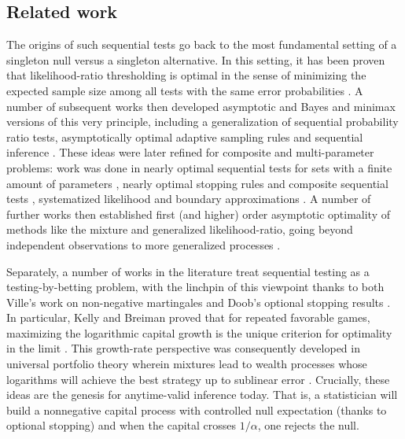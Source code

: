 \documentclass{article}
\theoremstyle{definition}
\begin{document}
\subsection*{Related work}
The origins of such sequential tests go back to the most fundamental setting of a singleton null versus a singleton alternative. In this setting, it has been proven that likelihood-ratio thresholding is optimal in the sense of minimizing the expected sample size among all tests with the same error probabilities \citep{Wald1945, WaldWolfowitz1948}. A number of subsequent works then developed asymptotic and Bayes and minimax versions of this very principle, including a generalization of sequential probability ratio tests, asymptotically optimal adaptive sampling rules and sequential inference \citep{KeiferWeiss, chernoff1959, KiefferSacks}. These ideas were later refined for composite and multi-parameter problems: work was done in nearly optimal sequential tests for sets with a finite amount of parameters \citep{Lorden1977}, nearly optimal stopping rules and composite sequential tests \citep{lai1973, Lai1988}, systematized likelihood and boundary approximations \citep{Siegmund1986}. A number of further works then established first (and higher) order asymptotic optimality of methods like the mixture and generalized likelihood-ratio, going beyond independent observations to more generalized processes \citep{Dragalin1999, Fellouris2013}.

Separately, a number of works in the literature treat sequential testing as a testing-by-betting problem, with the linchpin of this viewpoint thanks to both Ville's work on non-negative martingales and Doob's optional stopping results \citep{Ville1939, doob1953stochastic}. In particular, Kelly and Breiman proved that for repeated favorable games, maximizing the logarithmic capital growth is the unique criterion for optimality in the limit \citep{kellyinterpretation, breiman1961optimal}. This growth-rate perspective was consequently developed in universal portfolio theory wherein mixtures lead to wealth processes whose logarithms will achieve the best strategy up to sublinear error \citep{cover1987log, cover1996}. Crucially, these ideas are the genesis for anytime-valid inference today. That is, a statistician will build a nonnegative capital process with controlled null expectation (thanks to optional stopping) and when the capital crosses $1/\alpha$, one rejects the null.
\end{document}
